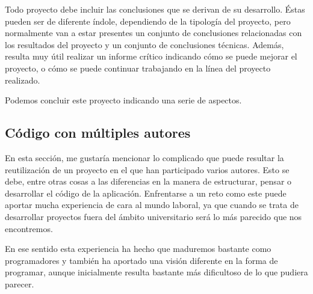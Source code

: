 
Todo proyecto debe incluir las conclusiones que se derivan de su desarrollo. Éstas pueden ser de diferente índole, dependiendo de la tipología del proyecto, pero normalmente van a estar presentes un conjunto de conclusiones relacionadas con los resultados del proyecto y un conjunto de conclusiones técnicas. 
Además, resulta muy útil realizar un informe crítico indicando cómo se puede mejorar el proyecto, o cómo se puede continuar trabajando en la línea del proyecto realizado. 

Podemos concluir este proyecto indicando una serie de aspectos.

\subsection{Código con múltiples autores}

En esta sección, me gustaría mencionar lo complicado que puede resultar la reutilización de un proyecto en el que han participado varios autores. Esto se debe, entre otras cosas a las diferencias en la manera de estructurar, pensar o desarrollar el código de la aplicación. Enfrentarse a un reto como este puede aportar mucha experiencia de cara al mundo laboral, ya que cuando se trata de desarrollar proyectos fuera del ámbito universitario será lo más parecido que nos encontremos.

En ese sentido esta experiencia ha hecho que maduremos bastante como programadores y también ha aportado una visión diferente en la forma de programar, aunque inicialmente resulta bastante más dificultoso de lo que pudiera parecer.
